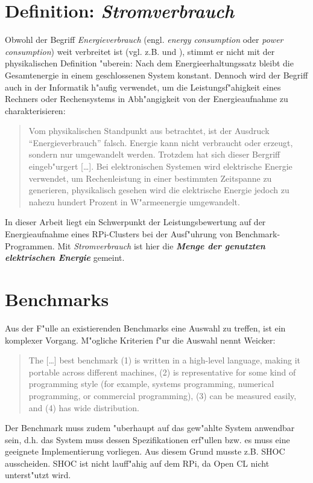 \section{Definition: \textit{Stromverbrauch}}\label{Stromverbrauch}

Obwohl der Begriff \textit{Energieverbrauch} (engl. \textit{energy consumption} oder \textit{power consumption}) weit verbreitet ist (vgl. z.B. \cite{fich13} und \cite{buh08}), stimmt er nicht mit der physikalischen Definition "uberein: Nach dem Energieerhaltungssatz bleibt die Gesamtenergie in einem geschlossenen System konstant. Dennoch wird der Begriff auch in der Informatik h"aufig verwendet, um die Leistungsf"ahigkeit eines Rechners oder Rechensystems in Abh"angigkeit von der Energieaufnahme zu charakterisieren:
\begin{quote}
\onehalfspacing
Vom physikalischen Standpunkt aus betrachtet, ist der Ausdruck "`Energieverbrauch"' falsch. Energie kann nicht verbraucht oder erzeugt, sondern nur umgewandelt werden. Trotzdem hat sich dieser Bergriff eingeb"urgert [\dots]. Bei elektronischen Systemen wird elektrische Energie verwendet, um Rechenleistung in einer bestimmten Zeitspanne zu generieren, physikalisch gesehen wird die elektrische Energie jedoch zu nahezu hundert Prozent in W"armeenergie umgewandelt. \cite{lan13}
\end{quote}
In dieser Arbeit liegt ein Schwerpunkt der Leistungsbewertung auf der Energieaufnahme eines RPi-Clusters bei der Ausf"uhrung von Benchmark-Programmen. Mit \textit{Stromverbrauch} ist hier die \textbf{\textit{Menge der genutzten elektrischen Energie}} gemeint.      

\section{Benchmarks}\label{Benchmarks}

Aus der F"ulle an existierenden Benchmarks eine Auswahl zu treffen, ist ein komplexer Vorgang. M"ogliche Kriterien f"ur die Auswahl nennt Weicker: 
\begin{quote}
\onehalfspacing
The [\dots] best benchmark (1) is written in a high-level language, making it portable across different machines, (2) is representative for some kind of programming style (for example, systems programming, numerical programming, or commercial programming), (3) can be measured easily, and (4) has wide distribution. \cite{wei90}
\end{quote}
Der Benchmark muss zudem "uberhaupt auf das gew"ahlte System anwendbar sein, d.h. das System muss dessen Spezifikationen erf"ullen bzw. es muss eine geeignete Implementierung vorliegen. Aus diesem Grund musste z.B. SHOC ausscheiden. SHOC ist nicht lauff"ahig auf dem RPi, da Open CL nicht unterst"utzt wird. 

